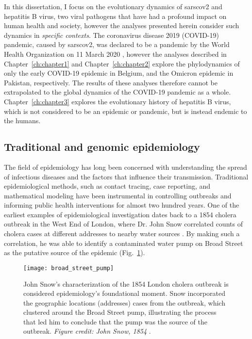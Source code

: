 In this dissertation, I focus on the evolutionary dynamics of \gls{sarscov2} and hepatitis B virus, two viral pathogens that have had a profound impact on human health and society, however the analyses presented herein consider such dynamics in \textit{specific contexts}.
The coronavirus disease 2019 (COVID-19) pandemic, caused by \gls{sarscov2}, was declared to be a pandemic by the World Health Organization on 11 March 2020 \citep{healthorganization2020coronavirus}, however the analyses described in Chapter~\ref{ch:chapter1} and Chapter~\ref{ch:chapter2} explore the phylodynamics of only the early COVID-19 epidemic in Belgium, and the Omicron epidemic in Pakistan, respectively.
The results of these analyses therefore cannot be extrapolated to the global dynamics of the COVID-19 pandemic as a whole.
Chapter~\ref{ch:chapter3} explores the evolutionary history of hepatitis B virus, which is not considered to be an epidemic or pandemic, but is instead endemic to the humans.

\subsection{Traditional and genomic epidemiology}\label{sec:tradVsGenEpi}
The field of epidemiology has long been concerned with understanding the spread of infectious diseases and the factors that influence their transmission.
Traditional epidemiological methods, such as contact tracing, case reporting, and mathematical modeling have been instrumental in controlling outbreaks and informing public health interventions for almost two hundred years.
One of the earliest examples of epidemiological investigation dates back to a 1854 cholera outbreak in the West End of London, where Dr. John Snow correlated counts of cholera cases at different addresses to nearby water sources \citep{snow1856mode2}.
By making such a correlation, he was able to identify a contaminated water pump on Broad Street as the putative source of the epidemic (Fig.~\ref{fig:broadStreetPump}).

\begin{figure}[ht]
  \centering
  \texttt{[image: broad\_street\_pump]}
  \caption[John Snow's map of the 1854 Broad Street cholera outbreak in London]{John Snow's characterization of the 1854 London cholera outbreak is considered epidemiology's foundational moment. Snow incorporated the geographic locations (addresses) cases from the outbreak, which clustered around the Broad Street pump, illustrating the process that led him to conclude that the pump was the source of the outbreak. \textit{Figure credit: John Snow, 1854} \citep{snow1854mode}.}
  \label{fig:broadStreetPump}
\end{figure}

